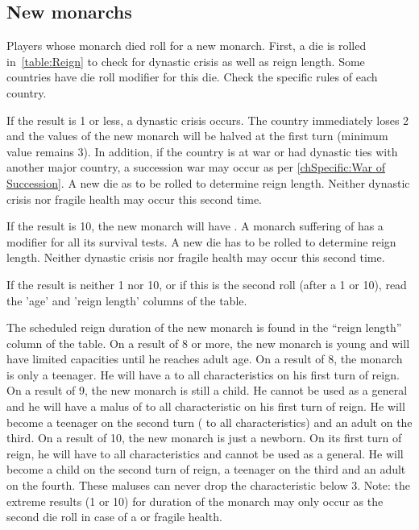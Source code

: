 


\subsection{New monarchs}\label{chEvents:Monarchs}

\aparag Players whose monarch died roll for a new monarch.
 First, a die is rolled in~\ref{table:Reign} to
check for dynastic crisis as well as reign length.
\bparag Some countries have die roll modifier for this die. Check the
specific rules of each country.

\label{chEvents:Dynastic Crisis} If the result
is 1 or less, a dynastic crisis occurs.
\bparag The country immediately loses 2 \STAB and the values of the new
monarch will be halved at the first turn (minimum value remains 3).
\bparag In addition, if the country is at war or had dynastic ties with
another major country, a succession war may occur as per
\ref{chSpecific:War of Succession}.
\bparag A new die as to be rolled to determine reign length. Neither
dynastic crisis nor fragile health may occur this second time.

 If the result is 10, the new monarch will have
.
\bparag A monarch suffering of  has a 
modifier for all its survival tests.
\bparag A new die has to be rolled to determine reign length. Neither
dynastic crisis nor fragile health may occur this second time.

\aparag If the result is neither 1 nor 10, or if this is the second
roll (after a 1 or 10), read the 'age' and 'reign length' columns of
the table.

\aparag The scheduled reign duration of the new monarch is found in the
``reign length'' column of the table.
\bparag On a result of 8 or more, the new monarch is young and will have
limited capacities until he reaches adult age.
\bparag On a result of 8, the monarch is only a teenager. He will have a
 to all characteristics on his first turn of reign.
\bparag On a result of 9, the new monarch is still a child. He cannot be
used as a general and he will have a malus of  to all
characteristic on his first turn of reign. He will become a teenager on
the second turn ( to all characteristics) and an adult on the
third.
\bparag On a result of 10, the new monarch is just a newborn. On its
first turn of reign, he will have  to all characteristics and
cannot be used as a general. He will become a child on the second turn
of reign, a teenager on the third and an adult on the fourth.
\bparag These maluses can never drop the characteristic below 3.
\aparag Note: the extreme results (1 or 10) for duration of the monarch
may only occur as the second die roll in case of a \DC or fragile
health.

